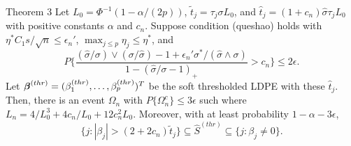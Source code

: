 \begin{frame}
\begin{block} {Theorem 3}
\scriptsize
    Let $L_0=\Phi^{-1}(1-\alpha/(2p))$, $\tilde{t}_j = \tau_j\sigma L_0$, and
$\hat{t}_j = (1+{c}_n)\hat{\sigma}\tau_j L_0$ with positive constants $\alpha$ and ${c}_n$. Suppose
condition (queshao) holds with $\eta^*C_1s/\sqrt{n}\leq \epsilon_n'$, $\max_{j\leq p}\eta_j\leq \eta^*$, and
\begin{equation}
P\Big\{\frac{(\hat{\sigma}/\sigma)\vee(\sigma/\hat{\sigma}) -1 + \epsilon_n'\sigma^*/(\hat{\sigma} \wedge \sigma)}
{1-(\hat{\sigma}/\sigma-1)_+ } > {c}_n\Big\} \leq 2\epsilon.
\end{equation}
    Let $\mbox{\boldmath $\beta$}^{(thr)} = (\beta_1^{(thr)},\ldots,\beta_p^{(thr)})^T$ be the {soft} thresholded LDPE
with these $\hat{t}_j$.
Then, there is an event $\Omega_n$ with $P\{\Omega_n^c\} \leq 3 \epsilon$ such %
where $L_n = 4/L_0^3+4{c}_n/L_0+12{c}_n^2L_0$.
Moreover, with at least probability $1-\alpha - 3\epsilon$,
\begin{equation}
\{j: |\beta_j|> (2+2{c}_n)\tilde{t}_j\} \subseteq \hat{S}^{(thr)} \subseteq \{j:\beta_j\neq 0\}.
\end{equation}
\end{block}
\end{frame}


